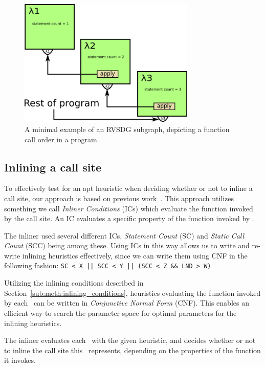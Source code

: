 \begin{figure}[H]
	\centering
	\includegraphics[width=0.75\textwidth]{figures/inline_ordering_ex}
	\caption{A minimal example of an RVSDG subgraph, depicting a function call
order in a program.}
	\label{fig:inline_ordering_ex}
\end{figure}

\subsection{Inlining a call site}
\label{sub:scheme:inlining_apply_nodes}

To effectively test for an apt heuristic when deciding whether or not to inline
a call site, our approach is based on previous
work~\cite{deshpande2012statically}\cite{AdaptvCompilAndInlingWaterman}. This
approach utilizes something we call \textit{Inliner Conditions} (ICs) which
evaluate the function invoked by the call site. An IC evaluates a specific
property of the function invoked by \applyNode .

The inliner used several different ICs, \textit{Statement Count} (SC) and
\textit{Static Call Count} (SCC) being among these. Using ICs in this way allows
us to write and re-write inlining heuristics effectively, since we can write
them using CNF in the following fashion:
\lstinline"SC < X || SCC < Y || (SCC < Z && LND > W)"

Utilizing the inlining conditions described in
Section~\ref{sub:meth:inlining_conditions}, heuristics evaluating the function
invoked by each \applyNode~can be written in \textit{Conjunctive Normal Form}
(CNF). This enables an efficient way to search the parameter space for optimal
parameters for the inlining heuristics.

The inliner evaluates each \applyNode~with the given heuristic, and decides
whether or not to inline the call site this \applyNode~represents, depending on
the properties of the function it invokes.

